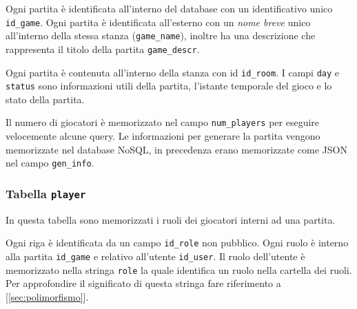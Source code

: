 Ogni partita è identificata all'interno del database con un identificativo unico \texttt{id\_game}. Ogni partita è identificata all'esterno con un \emph{nome breve} unico all'interno della stessa stanza (\texttt{game\_name}), inoltre ha una descrizione che rappresenta il titolo della partita \texttt{game\_descr}.

Ogni partita è contenuta all'interno della stanza con id \texttt{id\_room}. I campi \texttt{day} e \texttt{status} sono informazioni utili della partita, l'istante temporale del gioco e lo stato della partita.

Il numero di giocatori è memorizzato nel campo \texttt{num\_players} per eseguire velocemente alcune query. Le informazioni per generare la partita vengono memorizzate nel database NoSQL, in precedenza erano memorizzate come JSON nel campo \texttt{gen\_info}.

\newpage



\subsubsection{Tabella \texttt{player}}

In questa tabella sono memorizzati i ruoli dei giocatori interni ad una partita. 

Ogni riga è identificata da un campo \texttt{id\_role} non pubblico. Ogni ruolo è interno alla partita \texttt{id\_game} e relativo all'utente \texttt{id\_user}. Il ruolo dell'utente è memorizzato nella stringa \texttt{role} la quale identifica un ruolo nella cartella dei ruoli. Per approfondire il significato di questa stringa fare riferimento a [\ref{sec:polimorfismo}].


